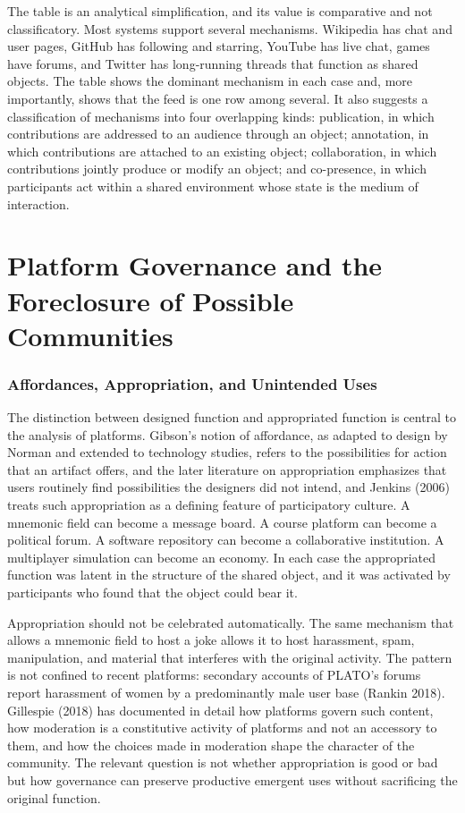 \documentclass[11pt]{article}
\theoremstyle{remark}
\begin{document}
The table is an analytical simplification, and its value is comparative and not classificatory. Most systems support several mechanisms. Wikipedia has chat and user pages, GitHub has following and starring, YouTube has live chat, games have forums, and Twitter has long-running threads that function as shared objects. The table shows the dominant mechanism in each case and, more importantly, shows that the feed is one row among several. It also suggests a classification of mechanisms into four overlapping kinds: publication, in which contributions are addressed to an audience through an object; annotation, in which contributions are attached to an existing object; collaboration, in which contributions jointly produce or modify an object; and co-presence, in which participants act within a shared environment whose state is the medium of interaction.

\part{Platform Governance and the Foreclosure of Possible Communities}

\section{Affordances, Appropriation, and Unintended Uses}

The distinction between designed function and appropriated function is central to the analysis of platforms. Gibson's notion of affordance, as adapted to design by Norman and extended to technology studies, refers to the possibilities for action that an artifact offers, and the later literature on appropriation emphasizes that users routinely find possibilities the designers did not intend, and Jenkins (2006) treats such appropriation as a defining feature of participatory culture. A mnemonic field can become a message board. A course platform can become a political forum. A software repository can become a collaborative institution. A multiplayer simulation can become an economy. In each case the appropriated function was latent in the structure of the shared object, and it was activated by participants who found that the object could bear it.

Appropriation should not be celebrated automatically. The same mechanism that allows a mnemonic field to host a joke allows it to host harassment, spam, manipulation, and material that interferes with the original activity. The pattern is not confined to recent platforms: secondary accounts of PLATO's forums report harassment of women by a predominantly male user base (Rankin 2018). Gillespie (2018) has documented in detail how platforms govern such content, how moderation is a constitutive activity of platforms and not an accessory to them, and how the choices made in moderation shape the character of the community. The relevant question is not whether appropriation is good or bad but how governance can preserve productive emergent uses without sacrificing the original function.
\end{document}
